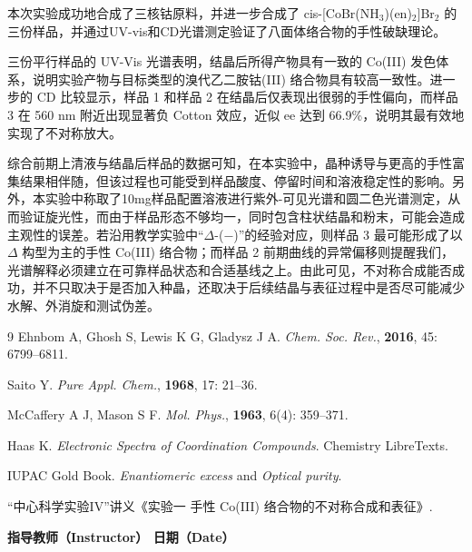 \documentclass[a4paper]{article}
\newcommand{\zihaoWu}{\fontsize{10.5pt}{16pt}\selectfont}
\begin{document}
本次实验成功地合成了三核钴原料，并进一步合成了 cis-[CoBr(NH$_3$)(en)$_2$]Br$_2$ 的三份样品，并通过UV-vis和CD光谱测定验证了八面体络合物的手性破缺理论。

三份平行样品的 UV-Vis 光谱表明，结晶后所得产物具有一致的 Co(III) 发色体系，说明实验产物与目标类型的溴代乙二胺钴(III) 络合物具有较高一致性。进一步的 CD 比较显示，样品 1 和样品 2 在结晶后仅表现出很弱的手性偏向，而样品 3 在 560 nm 附近出现显著负 Cotton 效应，近似 ee 达到 66.9\%，说明其最有效地实现了不对称放大。

综合前期上清液与结晶后样品的数据可知，在本实验中，晶种诱导与更高的手性富集结果相伴随，但该过程也可能受到样品酸度、停留时间和溶液稳定性的影响。另外，本实验中称取了10mg样品配置溶液进行紫外-可见光谱和圆二色光谱测定，从而验证旋光性，而由于样品形态不够均一，同时包含柱状结晶和粉末，可能会造成主观性的误差。若沿用教学实验中“$\Delta$-(−)”的经验对应，则样品 3 最可能形成了以 $\Delta$ 构型为主的手性 Co(III) 络合物；而样品 2 前期曲线的异常偏移则提醒我们，光谱解释必须建立在可靠样品状态和合适基线之上。由此可见，不对称合成能否成功，并不只取决于是否加入种晶，还取决于后续结晶与表征过程中是否尽可能减少水解、外消旋和测试伪差。

\vspace{1em}
{\footnotesize
	\begin{thebibliography}{9}
		Ehnbom A, Ghosh S, Lewis K G, Gladysz J A.
		\textit{Chem. Soc. Rev.}, \textbf{2016}, 45: 6799--6811.

		Saito Y.
		\textit{Pure Appl. Chem.}, \textbf{1968}, 17: 21--36.

		McCaffery A J, Mason S F.
		\textit{Mol. Phys.}, \textbf{1963}, 6(4): 359--371.

		Haas K.
		\textit{Electronic Spectra of Coordination Compounds}. Chemistry LibreTexts.

		IUPAC Gold Book.
		\textit{Enantiomeric excess} and \textit{Optical purity}.

		“中心科学实验IV”讲义《实验一 手性 Co(III) 络合物的不对称合成和表征》.
	\end{thebibliography}
}

\vspace*{\fill}
\noindent{\zihaoWu 评语（Remarks）：}

\vspace{2em}

\begin{center}
	{\zihaoWu\bfseries 指导教师（Instructor）\hspace{8em} 日期（Date）}
\end{center}

\vspace{1.5cm}
\end{document}
